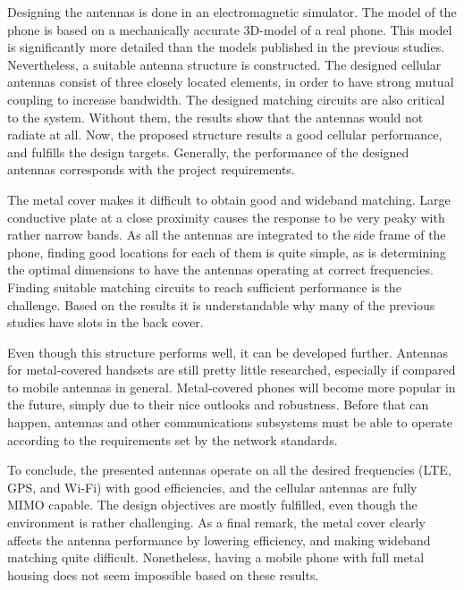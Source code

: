 Designing the antennas is done in an electromagnetic simulator. The model of the phone is based on a mechanically accurate 3D-model of a real phone. This model is significantly more detailed than the models published in the previous studies. Nevertheless, a suitable antenna structure is constructed. The designed cellular antennas consist of three closely located elements, in order to have strong mutual coupling to increase bandwidth. The designed matching circuits are also critical to the system. Without them, the results show that the antennas would not radiate at all. Now, the proposed structure results a good cellular performance, and fulfills the design targets. Generally, the performance of the designed antennas corresponds with the project requirements.

The metal cover makes it difficult to obtain good and wideband matching. Large conductive plate at a close proximity causes the response to be very peaky with rather narrow bands. As all the antennas are integrated to the side frame of the phone, finding good locations for each of them is quite simple, as is determining the optimal dimensions to have the antennas operating at correct frequencies. Finding suitable matching circuits to reach sufficient performance is the challenge. Based on the results it is understandable why many of the previous studies have slots in the back cover.

Even though this structure performs well, it can be developed further. Antennas for metal-covered handsets are still pretty little researched, especially if compared to mobile antennas in general. Metal-covered phones will become more popular in the future, simply due to their nice outlooks and robustness. Before that can happen, antennas and other communications subsystems must be able to operate according to the requirements set by the network standards.

To conclude, the presented antennas operate on all the desired frequencies (LTE, GPS, and Wi-Fi) with good efficiencies, and the cellular antennas are fully MIMO capable. The design objectives are mostly fulfilled, even though the environment is rather challenging. As a final remark, the metal cover clearly affects the antenna performance by lowering efficiency, and making wideband matching quite difficult. Nonetheless, having a mobile phone with full metal housing does not seem impossible based on these results.


\clearpage